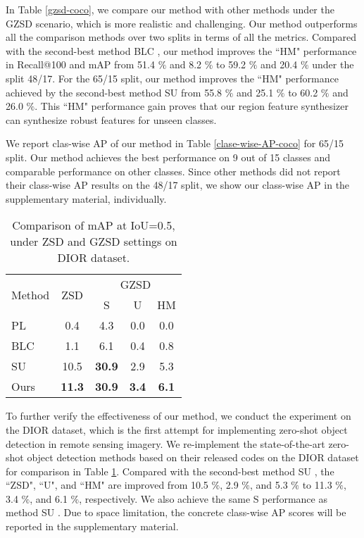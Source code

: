 \documentclass[10pt,twocolumn,letterpaper]{article}
\begin{document}
In Table \ref{gzsd-coco}, we compare our method with other methods under the GZSD scenario, which is more realistic and challenging. Our method outperforms all the comparison methods over two splits in terms of all the metrics.  Compared with the second-best method BLC \cite{zheng2020background}, our method improves the ``HM" performance in Recall@100 and mAP from 51.4 $\%$ and 8.2 $\%$ to 59.2 $\%$ and 20.4 $\%$ under the split 48/17. For the 65/15 split, our method improves the ``HM" performance achieved by the second-best method SU \cite{hayat2020synthesizing} from 55.8 $\%$ and 25.1 $\%$ to 60.2 $\%$ and 26.0 $\%$. This ``HM" performance gain proves that our region feature synthesizer can synthesize robust features for unseen classes.

We report clas-wise AP of our method in Table \ref{clase-wise-AP-coco} for 65/15 split. Our method achieves the best performance on 9 out of 15 classes and comparable performance on other classes. Since other methods did not report their class-wise AP results on the 48/17 split, we show our class-wise AP in the supplementary material, individually.

\begin{table}[t]
  \centering

  \caption{Comparison of mAP at IoU=0.5, under ZSD and GZSD settings on DIOR dataset.}
\renewcommand\tabcolsep{9.0pt}
    \begin{tabular}{lcccc}
    \toprule
    \multirow{2}[4]{*}{Method} & \multirow{2}[4]{*}{ZSD} & \multicolumn{3}{c}{GZSD} \\
\cmidrule{3-5}          &       & S     & U     & HM \\
    \midrule
    PL \cite{rahman2020improved}   & 0.4   & 4.3   & 0.0     & 0.0 \\
    BLC \cite{zheng2020background}  & 1.1   & 6.1   & 0.4   & 0.8 \\
    SU \cite{hayat2020synthesizing}   & 10.5  & \textbf{30.9}  & 2.9   & 5.3 \\
    Ours  & \textbf{11.3}  & \textbf{30.9}  & \textbf{3.4}   & \textbf{6.1} \\
    \bottomrule
    \end{tabular}\label{tab-dior}\end{table}To further verify the effectiveness of our method, we conduct the experiment on the DIOR dataset, which is the first attempt for implementing zero-shot object detection in remote sensing imagery. We re-implement the
state-of-the-art zero-shot object detection methods based on their released codes on the DIOR dataset for comparison in Table \ref{tab-dior}. Compared with the second-best method SU \cite{hayat2020synthesizing}, the ``ZSD", ``U", and ``HM" are improved from 10.5 $\%$, 2.9 $\%$, and 5.3 $\%$ to 11.3 $\%$, 3.4 $\%$, and 6.1 $\%$, respectively. We also achieve the same S performance as method SU \cite{hayat2020synthesizing}. Due to space limitation, the concrete class-wise AP scores will be reported in the supplementary material.
\end{document}
